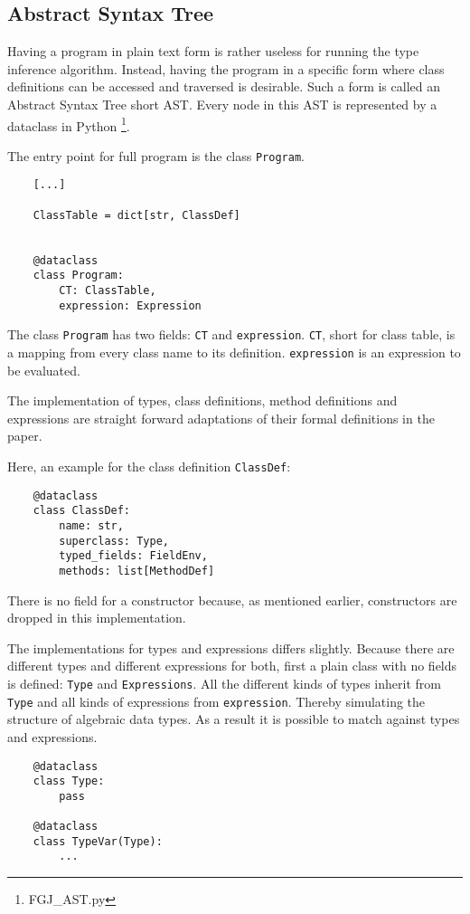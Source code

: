 \subsection{Abstract Syntax Tree}

Having a program in plain text form is rather useless for running the type inference algorithm. Instead, having the program in a specific form where class definitions can be accessed and traversed is desirable.
Such a form is called an Abstract Syntax Tree short AST. Every node in this AST is represented by a dataclass in Python \footnote{FGJ\_AST.py}.

The entry point for full program is the class \verb|Program|.
\begin{verbatim}
    [...]

    ClassTable = dict[str, ClassDef]


    @dataclass
    class Program:
        CT: ClassTable,
        expression: Expression
\end{verbatim}

The class \verb|Program| has two fields: \verb|CT| and \verb|expression|. \verb|CT|, short for class table, is a mapping from every class name to its definition. \verb|expression| is an expression to be evaluated.

The implementation of types, class definitions, method definitions and expressions are straight forward adaptations of their formal definitions in the paper.

Here, an example for the class definition \verb|ClassDef|:
\begin{verbatim}
    @dataclass
    class ClassDef:
        name: str,
        superclass: Type,
        typed_fields: FieldEnv,
        methods: list[MethodDef]
\end{verbatim}

There is no field for a constructor because, as mentioned earlier, constructors are dropped in this implementation.

The implementations for types and expressions differs slightly. Because there are different types and different expressions for both, first a plain class with no fields is defined: \verb|Type| and \verb|Expressions|. All the different kinds of types inherit from \verb|Type| and all kinds of expressions from \verb|expression|. Thereby simulating the structure of algebraic data types.
As a result it is possible to match against types and expressions.

\begin{verbatim}
    @dataclass
    class Type:
        pass

    @dataclass
    class TypeVar(Type):
        ...
\end{verbatim}

